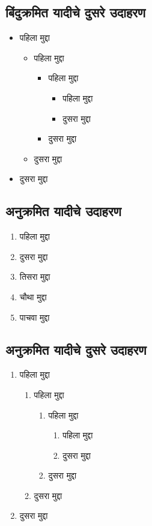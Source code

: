 \subsection*{बिंदुक्रमित यादीचे दुसरे उदाहरण}

\begin{itemize}
\item पहिला मुद्दा
  \begin{itemize}
  \item पहिला मुद्दा
    \begin{itemize}
    \item पहिला मुद्दा
      \begin{itemize}
      \item पहिला मुद्दा
      \item दुसरा मुद्दा
      \end{itemize}
    \item दुसरा मुद्दा
    \end{itemize}
  \item दुसरा मुद्दा
  \end{itemize}
\item दुसरा मुद्दा
\end{itemize}

\subsection{अनुक्रमित यादीचे उदाहरण}

\begin{enumerate}
\item पहिला मुद्दा
\item दुसरा मुद्दा
\item तिसरा मुद्दा
\item चौथा मुद्दा
\item पाचवा मुद्दा
\end{enumerate}

\subsection*{अनुक्रमित यादीचे दुसरे उदाहरण}

\begin{enumerate}
\item पहिला मुद्दा
  \begin{enumerate}
  \item पहिला मुद्दा
    \begin{enumerate}
    \item पहिला मुद्दा
      \begin{enumerate}
      \item पहिला मुद्दा
      \item दुसरा मुद्दा
      \end{enumerate}
    \item दुसरा मुद्दा
    \end{enumerate}
  \item दुसरा मुद्दा
  \end{enumerate}
\item दुसरा मुद्दा
\end{enumerate}

